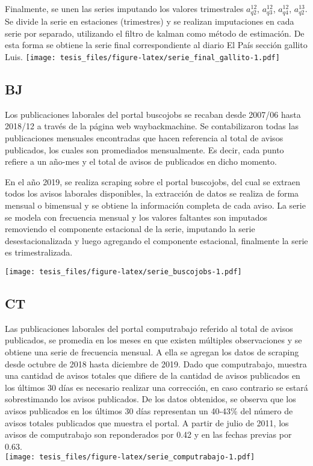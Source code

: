\documentclass[12pt,twoside]{reedthesis}
\begin{document}
Finalmente, se unen las series imputando los valores trimestrales \(a_{q2}^{12}\), \(a_{q3}^{12}\), \(a_{q4}^{12}\), \(a_{q2}^{13}\). Se divide la serie en estaciones (trimestres) y se realizan imputaciones en cada serie por separado, utilizando el filtro de kalman como método de estimación. De esta forma se obtiene la serie final correspondiente al diario El País sección gallito Luis.
\texttt{[image: tesis\_files/figure-latex/serie\_final\_gallito-1.pdf]}

\hypertarget{bj}{%
\subsection{BJ}\label{bj}}

Los publicaciones laborales del portal buscojobs se recaban desde 2007/06 hasta 2018/12 a través de la página web waybackmachine. Se contabilizaron todas las publicaciones mensuales encontradas que hacen referencia al total de avisos publicados, los cuales son promediados mensualmente. Es decir, cada punto refiere a un año-mes y el total de avisos de publicados en dicho momento.

En el año 2019, se realiza scraping sobre el portal buscojobs, del cual se extraen todos los avisos laborales disponibles, la extracción de datos se realiza de forma mensual o bimensual y se obtiene la información completa de cada aviso.
La serie se modela con frecuencia mensual y los valores faltantes son imputados removiendo el componente estacional de la serie, imputando la serie desestacionalizada y luego agregando el componente estacional, finalmente la serie es trimestralizada.

\texttt{[image: tesis\_files/figure-latex/serie\_buscojobs-1.pdf]}

\hypertarget{ct}{%
\subsection{CT}\label{ct}}

Las publicaciones laborales del portal computrabajo referido al total de avisos publicados, se promedia en los meses en que existen múltiples observaciones y se obtiene una serie de frecuencia mensual. A ella se agregan los datos de scraping desde octubre de 2018 hasta diciembre de 2019. Dado que computrabajo, muestra una cantidad de avisos totales que difiere de la cantidad de avisos publicados en los últimos 30 días es necesario realizar una corrección, en caso contrario se estará sobrestimando los avisos publicados. De los datos obtenidos, se observa que los avisos publicados en los últimos 30 días representan un 40-43\% del número de avisos totales publicados que muestra el portal. A partir de julio de 2011, los avisos de computrabajo son reponderados por 0.42 y en las fechas previas por 0.63.\\
\texttt{[image: tesis\_files/figure-latex/serie\_computrabajo-1.pdf]}
\end{document}

